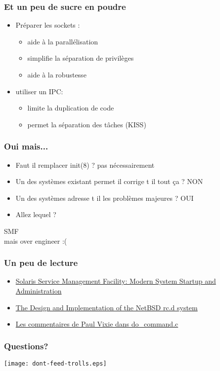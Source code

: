 \begin{frame}
	\frametitle{Et un peu de sucre en poudre}
	\begin{itemize}
			\pause
		\item Préparer les sockets :
			\begin{itemize}
				\item aide à la parallélisation
				\item simplifie la séparation de privilèges
				\item aide à la robustesse
			\end{itemize}
			\pause
		\item utiliser un IPC:
			\begin{itemize}
				\item limite la duplication de code
				\item permet la séparation des tâches (KISS)
			\end{itemize}
	\end{itemize}
\end{frame}

\begin{frame}
	\frametitle{Oui mais...}
	\begin{itemize}
			\pause
		\item Faut il remplacer init(8) ? \pause pas nécessairement
			\pause
		\item Un des systèmes existant permet il corrige t il tout ça ? \pause NON
			\pause
		\item Un des systèmes adresse t il les problèmes majeures ? \pause OUI
			\pause
		\item Allez lequel ?\pause
	\end{itemize}
	\center
	\huge SMF \\
	\pause
	\normalsize
	mais over engineer :(
\end{frame}

\begin{frame}
	\frametitle{Un peu de lecture}
	\begin{itemize}
		\item \href{https://www.usenix.org/legacy/event/lisa05/tech/full_papers/adams/adams.pdf}{Solaris Service Management Facility: Modern System Startup and Administration}
		\item \href{https://www.usenix.org/legacy/event/usenix01/freenix01/full_papers/mewburn/mewburn_html/}{The Design and Implementation of the NetBSD rc.d system}
		\item \href{https://svnweb.freebsd.org/base/head/usr.sbin/cron/cron/do_command.c?view=markup}{Les commentaires de Paul Vixie dans do\_command.c}
	\end{itemize}
\end{frame}

\begin{frame}
	\frametitle{Questions?}
	\center
	\texttt{[image: dont-feed-trolls.eps]}
\end{frame}


